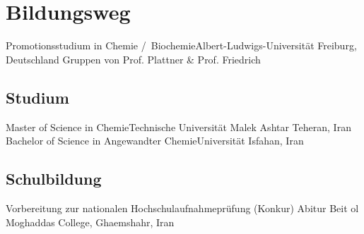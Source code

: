 

\section{Bildungsweg}

 {Promotionsstudium in Chemie \slash  ~Biochemie}{Albert-Ludwigs-Universität Freiburg, Deutschland \newline Gruppen von Prof. Plattner \& Prof. Friedrich}{}{}{}







\subsection{Studium}
 {Master of Science in Chemie}{Technische Universität Malek Ashtar Teheran, Iran}{}{}{}
 {Bachelor of Science in Angewandter Chemie}{Universität Isfahan, Iran}{}{}{}

\subsection{Schulbildung}
 {Vorbereitung zur nationalen Hochschulaufnahmeprüfung (Konkur)}{}{}{}{}
 {Abitur}{
}{Beit ol Moghaddas College, Ghaemshahr, Iran}{}{}{}


